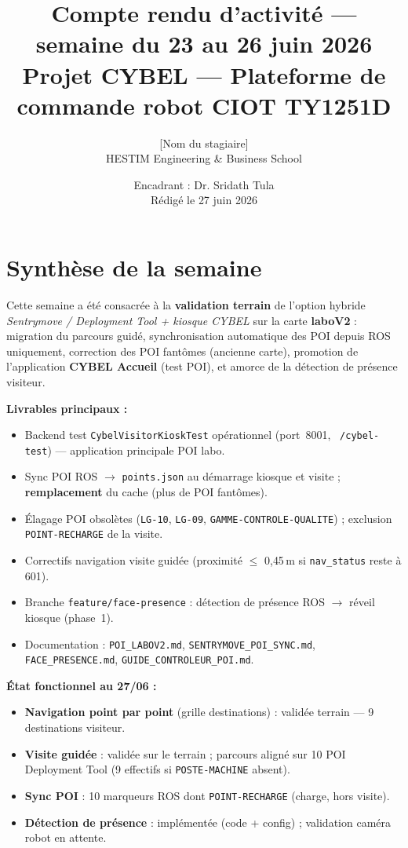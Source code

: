 \documentclass[11pt,a4paper]{article}
\title{\textbf{Compte rendu d'activité — semaine du 23 au 26 juin 2026}\\[0.4em]
\large Projet CYBEL — Plateforme de commande robot CIOT TY1251D}
\author{[Nom du stagiaire]\\HESTIM Engineering \& Business School}
\date{Encadrant : Dr. Sridath Tula\\Rédigé le 27 juin 2026}
\begin{document}
\maketitle
\tableofcontents
\newpage

\section{Synthèse de la semaine}

Cette semaine a été consacrée à la \textbf{validation terrain} de l'option hybride \emph{Sentrymove / Deployment Tool + kiosque CYBEL} sur la carte \textbf{laboV2} : migration du parcours guidé, synchronisation automatique des POI depuis ROS uniquement, correction des POI fantômes (ancienne carte), promotion de l'application \textbf{CYBEL Accueil} (test POI), et amorce de la détection de présence visiteur.

\textbf{Livrables principaux :}
\begin{itemize}[noitemsep]
  \item Backend test \texttt{CybelVisitorKioskTest} opérationnel (port~8001, \texttt{~/cybel-test}) — application principale POI labo.
  \item Sync POI ROS $\rightarrow$ \texttt{points.json} au démarrage kiosque et visite ; \textbf{remplacement} du cache (plus de POI fantômes).
  \item Élagage POI obsolètes (\texttt{LG-10}, \texttt{LG-09}, \texttt{GAMME-CONTROLE-QUALITE}) ; exclusion \texttt{POINT-RECHARGE} de la visite.
  \item Correctifs navigation visite guidée (proximité $\leq$ 0{,}45\,m si \texttt{nav\_status} reste à 601).
  \item Branche \texttt{feature/face-presence} : détection de présence ROS $\rightarrow$ réveil kiosque (phase~1).
  \item Documentation : \texttt{POI\_LABOV2.md}, \texttt{SENTRYMOVE\_POI\_SYNC.md}, \texttt{FACE\_PRESENCE.md}, \texttt{GUIDE\_CONTROLEUR\_POI.md}.
\end{itemize}

\textbf{État fonctionnel au 27/06 :}
\begin{itemize}[noitemsep]
  \item \textbf{Navigation point par point} (grille destinations) : validée terrain — 9 destinations visiteur.
  \item \textbf{Visite guidée} : validée sur le terrain ; parcours aligné sur 10 POI Deployment Tool (9 effectifs si \texttt{POSTE-MACHINE} absent).
  \item \textbf{Sync POI} : 10 marqueurs ROS dont \texttt{POINT-RECHARGE} (charge, hors visite).
  \item \textbf{Détection de présence} : implémentée (code + config) ; validation caméra robot en attente.
\end{itemize}
\end{document}
